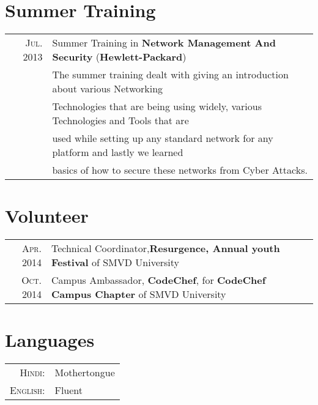 \documentclass[a4paper,10pt]{article}
\begin{document}
\section{Summer Training}
\begin{tabular}{rl}
 \textsc{Jul.} 2013 & Summer Training in \large\textbf{Network Management And Security} (\normalsize\textbf{Hewlett-Packard})\normalsize\\ & The summer training dealt with giving an introduction about various Networking \\ & Technologies that are being using widely, various Technologies and Tools that are\\ & used while setting up any standard network for any platform and lastly we learned \\ & basics of how to secure these networks from Cyber Attacks.   \\
 
\end{tabular}

\section{Volunteer}
\begin{tabular}{rl}
 \textsc{Apr.} 2014 & Technical Coordinator,\normalsize\textbf{Resurgence, Annual youth Festival} of SMVD University\\
 \textsc{Oct.} 2014 & Campus Ambassador,\normalsize\textbf{   CodeChef}, for \normalsize\textbf{CodeChef Campus Chapter} of SMVD University\\
\end{tabular}


\section{Languages}
\begin{tabular}{rl}
 \textsc{Hindi:}&Mothertongue\\
\textsc{English:}&Fluent\\
\end{tabular}

\end{document}

